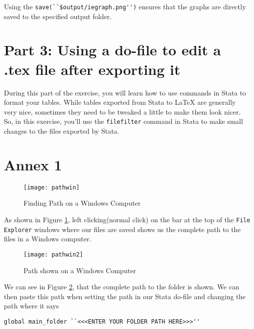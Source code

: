 \documentclass[]{article}
\begin{document}
Using the \verb|save(``$output/iegraph.png'')| ensures that the graphs are directly saved to the specified output folder. 

\section*{Part 3: Using a do-file to edit a .tex file after exporting it}

During this part of the exercise, you will learn how to use commands in Stata to format your tables. While tables exported from Stata to {\LaTeX} are generally very nice, sometimes they need to be tweaked a little to make them look nicer. So, in this exercise, you'll use the \texttt{filefilter} command in Stata to make small changes to the files exported by Stata. 

\newpage
\section*{Annex 1} {\label{annex1}}

\begin{figure}[H]
	\centering
	\texttt{[image: pathwin]}
	\caption{Finding Path on a Windows Computer}
	\label{fig:pathwin}
\end{figure}
As shown in Figure \ref{fig:pathwin}, left clicking(normal click) on the bar at the top of the \texttt{File Explorer} windows where our files are saved shows us the complete path to the files in a Windows computer. \\

\begin{figure}[H]
	\centering
	\texttt{[image: pathwin2]}
	\caption{Path shown on a Windows Computer}
	\label{fig:pathwin2}
\end{figure}

We can see in Figure \ref{fig:pathwin2}, that the complete path to the folder is shown. We can then paste this path when setting the path in our Stata do-file and changing the path where it says \begin{verbatim}
global main_folder ``<<<ENTER YOUR FOLDER PATH HERE>>>''
\end{verbatim} 
	
\end{document}
